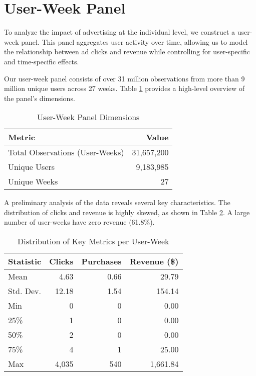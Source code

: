 \section*{User-Week Panel}

To analyze the impact of advertising at the individual level, we construct a user-week panel. This panel aggregates user activity over time, allowing us to model the relationship between ad clicks and revenue while controlling for user-specific and time-specific effects.

Our user-week panel consists of over 31 million observations from more than 9 million unique users across 27 weeks. Table \ref{tab:user_panel_dims} provides a high-level overview of the panel's dimensions.

\begin{table}[htbp!]
\centering
\caption{User-Week Panel Dimensions}
\label{tab:user_panel_dims}
\begin{tabular}{lr}
\toprule
Metric & Value \\
\midrule
Total Observations (User-Weeks) & 31,657,200 \\
Unique Users & 9,183,985 \\
Unique Weeks & 27 \\
\bottomrule
\end{tabular}
\end{table}

A preliminary analysis of the data reveals several key characteristics. The distribution of clicks and revenue is highly skewed, as shown in Table \ref{tab:user_dist}. A large number of user-weeks have zero revenue (61.8\%).

\begin{table}[htbp!]
\centering
\caption{Distribution of Key Metrics per User-Week}
\label{tab:user_dist}
\begin{tabular}{lrrr}
\toprule
Statistic & Clicks & Purchases & Revenue (\$) \\
\midrule
Mean & 4.63 & 0.66 & 29.79 \\
Std. Dev. & 12.18 & 1.54 & 154.14 \\ 

Min & 0 & 0 & 0.00 \\
25\% & 1 & 0 & 0.00 \\
50\% & 2 & 0 & 0.00 \\
75\% & 4 & 1 & 25.00 \\
Max & 4,035 & 540 & 1,661.84 \\
\bottomrule
\end{tabular}
\end{table}

